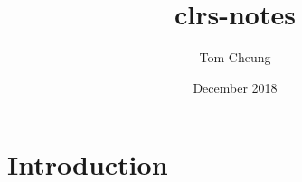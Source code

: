 \documentclass{article}
\title{clrs-notes}
\author{Tom Cheung}
\date{December 2018}
\begin{document}
\maketitle

\section{Introduction}
\end{document}
